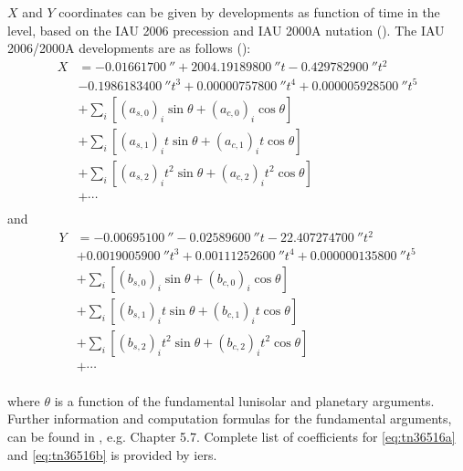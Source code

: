 $X$ and $Y$ coordinates can be given by developments as function of time in the 
\si{\micro\larcsecond} level, based on the IAU 2006 precession and IAU 2000A
nutation (\cite{Capitaine2006a}).
The IAU 2006/2000A developments are as follows (\cite{iers2010}):
\begin{equation}
  \label{eq:tn36516a}
  \begin{aligned}
  X &= \SI{-0.01661700}{\arcsecond} + \SI{2004.19189800}{\arcsecond} t - \SI{0.429782900}{\arcsecond} t^2 \\
  &- \SI{0.1986183400}{\arcsecond}t^3 + \SI{0.00000757800}{\arcsecond} t^4 + \SI{0.000005928500}{\arcsecond} t^5 \\
  &+ \sum_{i} \left[ (a_{s,0})_i \sin \theta + (a_{c,0})_i \cos \theta \right] \\ 
  &+ \sum_{i} \left[ (a_{s,1})_i t \sin \theta + (a_{c,1})_i t \cos \theta \right] \\ 
  &+ \sum_{i} \left[ (a_{s,2})_i t^2 \sin \theta + (a_{c,2})_i t^2 \cos \theta \right] \\ 
  &+ \cdots \\
  \end{aligned}
\end{equation}
and
\begin{equation}
  \label{eq:tn36516b}
  \begin{aligned}
  Y &= -\SI{0.00695100}{\arcsecond} - \SI{0.02589600}{\arcsecond} t - \SI{22.407274700}{\arcsecond} t^2 \\
  &+ \SI{0.0019005900}{\arcsecond} t^3 + \SI{0.00111252600}{\arcsecond} t^4 + \SI{0.000000135800}{\arcsecond} t^5 \\
  &+ \sum_{i} \left[ (b_{s,0})_i \sin \theta     + (b_{c,0})_i \cos \theta \right] \\ 
  &+ \sum_{i} \left[ (b_{s,1})_i t \sin \theta   + (b_{c,1})_i t \cos \theta \right] \\ 
  &+ \sum_{i} \left[ (b_{s,2})_i t^2 \sin \theta + (b_{c,2})_i t^2 \cos \theta \right] \\ 
  &+ \cdots \\
  \end{aligned}
\end{equation}

where $\theta$ is a function of the fundamental lunisolar and planetary arguments.
Further information and computation formulas for the fundamental arguments, 
can be found in \cite{iers2010}, e.g. Chapter 5.7. Complete 
list of coefficients for \autoref{eq:tn36516a} and \autoref{eq:tn36516b} is provided 
by \gls{iers}. 


